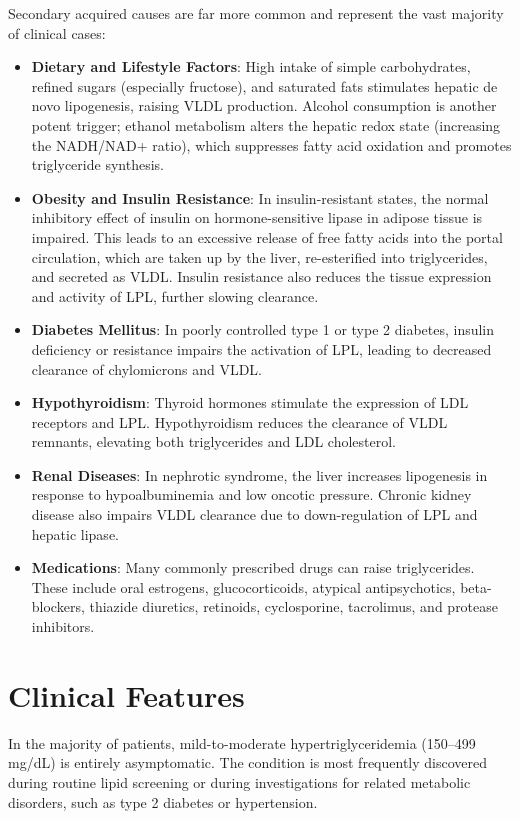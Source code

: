 Secondary acquired causes are far more common and represent the vast majority of clinical cases:
\begin{itemize}
    \item \textbf{Dietary and Lifestyle Factors}: High intake of simple carbohydrates, refined sugars (especially fructose), and saturated fats stimulates hepatic de novo lipogenesis, raising VLDL production. Alcohol consumption is another potent trigger; ethanol metabolism alters the hepatic redox state (increasing the NADH/NAD+ ratio), which suppresses fatty acid oxidation and promotes triglyceride synthesis.
    \item \textbf{Obesity and Insulin Resistance}: In insulin-resistant states, the normal inhibitory effect of insulin on hormone-sensitive lipase in adipose tissue is impaired. This leads to an excessive release of free fatty acids into the portal circulation, which are taken up by the liver, re-esterified into triglycerides, and secreted as VLDL. Insulin resistance also reduces the tissue expression and activity of LPL, further slowing clearance.
    \item \textbf{Diabetes Mellitus}: In poorly controlled type 1 or type 2 diabetes, insulin deficiency or resistance impairs the activation of LPL, leading to decreased clearance of chylomicrons and VLDL.
    \item \textbf{Hypothyroidism}: Thyroid hormones stimulate the expression of LDL receptors and LPL. Hypothyroidism reduces the clearance of VLDL remnants, elevating both triglycerides and LDL cholesterol.
    \item \textbf{Renal Diseases}: In nephrotic syndrome, the liver increases lipogenesis in response to hypoalbuminemia and low oncotic pressure. Chronic kidney disease also impairs VLDL clearance due to down-regulation of LPL and hepatic lipase.
    \item \textbf{Medications}: Many commonly prescribed drugs can raise triglycerides. These include oral estrogens, glucocorticoids, atypical antipsychotics, beta-blockers, thiazide diuretics, retinoids, cyclosporine, tacrolimus, and protease inhibitors.
\end{itemize}

\section*{Clinical Features}
In the majority of patients, mild-to-moderate hypertriglyceridemia (150--499 mg/dL) is entirely asymptomatic. The condition is most frequently discovered during routine lipid screening or during investigations for related metabolic disorders, such as type 2 diabetes or hypertension.


